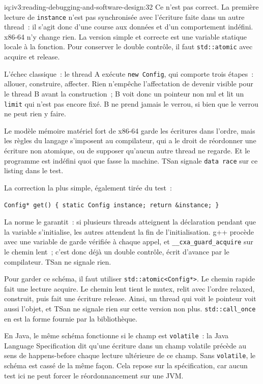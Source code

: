 \begin{solution}{iq:iv3:reading-debugging-and-software-design:32}
Ce n'est pas correct. La première lecture de \texttt{instance} n'est pas synchronisée avec l'écriture faite dans un autre thread~: il s'agit donc d'une course aux données et d'un comportement indéfini. x86-64 n'y change rien. La version simple et correcte est une variable statique locale à la fonction. Pour conserver le double contrôle, il faut \texttt{std::atomic} avec acquire et release.

L'échec classique~: le thread A exécute \texttt{new Config}, qui comporte trois étapes~: allouer, construire, affecter. Rien n'empêche l'affectation de devenir visible pour le thread B avant la construction~; B voit donc un pointeur non nul et lit un \texttt{limit} qui n'est pas encore fixé. B ne prend jamais le verrou, si bien que le verrou ne peut rien y faire.

Le modèle mémoire matériel fort de x86-64 garde les écritures dans l'ordre, mais les règles du langage s'imposent au compilateur, qui a le droit de réordonner une écriture non atomique, ou de supposer qu'aucun autre thread ne regarde. Et le programme est indéfini quoi que fasse la machine. TSan signale \texttt{data race} sur ce listing dans le test.

La correction la plus simple, également tirée du test~:

\texttt{Config* get() \{ static Config instance; return \&instance; \}}

La norme le garantit~: si plusieurs threads atteignent la déclaration pendant que la variable s'initialise, les autres attendent la fin de l'initialisation. g++ procède avec une variable de garde vérifiée à chaque appel, et \texttt{\_\_cxa\_guard\_acquire} sur le chemin lent~; c'est donc déjà un double contrôle, écrit d'avance par le compilateur. TSan ne signale rien.

Pour garder ce schéma, il faut utiliser \texttt{std::atomic<Config*>}. Le chemin rapide fait une lecture acquire. Le chemin lent tient le mutex, relit avec l'ordre relaxed, construit, puis fait une écriture release. Ainsi, un thread qui voit le pointeur voit aussi l'objet, et TSan ne signale rien sur cette version non plus. \texttt{std::call\_once} en est la forme fournie par la bibliothèque.

En Java, le même schéma fonctionne si le champ est \texttt{volatile}~: la Java Language Specification dit qu'une écriture dans un champ volatile précède au sens de happens-before chaque lecture ultérieure de ce champ. Sans \texttt{volatile}, le schéma est cassé de la même façon. Cela repose sur la spécification, car aucun test ici ne peut forcer le réordonnancement sur une JVM.


\end{solution}

